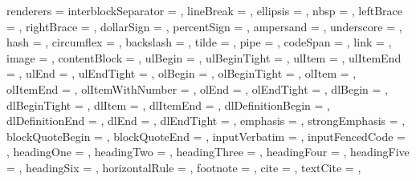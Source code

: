 renderers = {%
  interblockSeparator = {%
    \GOBBLE},
  lineBreak = {%
    \GOBBLE},
  ellipsis = {%
    \GOBBLE},
  nbsp = {%
    \GOBBLE},
  leftBrace = {%
    \GOBBLE},
  rightBrace = {%
    \GOBBLE},
  dollarSign = {%
    \GOBBLE},
  percentSign = {%
    \GOBBLE},
  ampersand = {%
    \GOBBLE},
  underscore = {%
    \GOBBLE},
  hash = {%
    \GOBBLE},
  circumflex = {%
    \GOBBLE},
  backslash = {%
    \GOBBLE},
  tilde = {%
    \GOBBLE},
  pipe = {%
    \GOBBLE},
  codeSpan = {%
    },
  link = {%
    },
  image = {%
    },
  contentBlock = {%
  },
  ulBegin = {%
    },
  ulBeginTight = {%
    },
  ulItem = {%
    },
  ulItemEnd = {%
    },
  ulEnd = {%
    },
  ulEndTight = {%
    },
  olBegin = {%
    },
  olBeginTight = {%
    },
  olItem = {%
    },
  olItemEnd = {%
    },
  olItemWithNumber = {%
    },
  olEnd = {%
    },
  olEndTight = {%
    },
  dlBegin = {%
    },
  dlBeginTight = {%
    },
  dlItem = {%
    },
  dlItemEnd = {%
    },
  dlDefinitionBegin = {%
    },
  dlDefinitionEnd = {%
    },
  dlEnd = {%
    },
  dlEndTight = {%
    },
  emphasis = {%
    },
  strongEmphasis = {%
    },
  blockQuoteBegin = {%
    },
  blockQuoteEnd = {%
    },
  inputVerbatim = {%
    },
  inputFencedCode = {%
    },
  headingOne = {%
    },
  headingTwo = {%
    },
  headingThree = {%
    },
  headingFour = {%
    },
  headingFive = {%
    },
  headingSix = {%
    },
  horizontalRule = {%
    },
  footnote = {%
    },
  cite = {%
    },
  textCite = {%
    },
}
